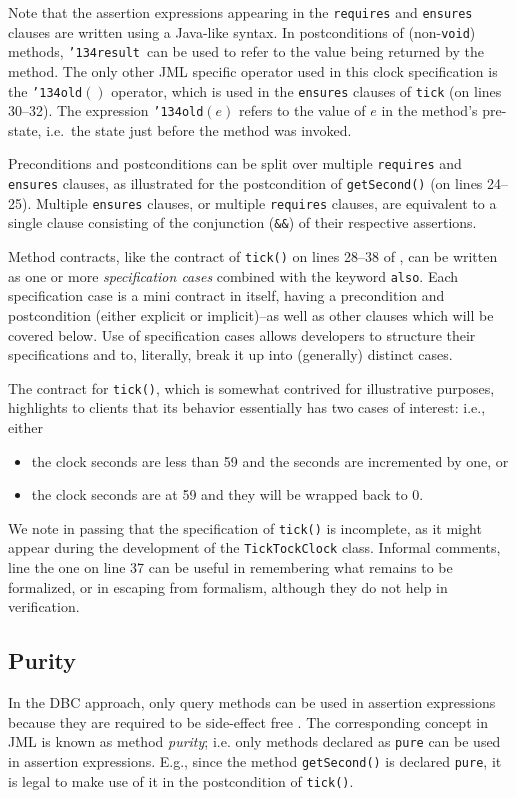 \documentclass{llncs}
\def\old{\texttt{\char'134old}}
\def\result{\texttt{\char'134result}}
\begin{document}
Note that the assertion expressions appearing in the \texttt{requires} and
\texttt{ensures} clauses are written using a Java-like syntax.
%
\GMARGIN{\old}
\GMARGIN{\result}
%
In postconditions of (non-\texttt{void}) methods, \result\ can be used to refer to the 
value being returned by the method.
The only other JML specific operator used in this clock specification is the
\old$()$ operator, which is used in the \texttt{ensures} clauses of
\texttt{tick} (on lines 30--32).  The 
expression \old$(e)$ refers to the value of $e$ in the method's pre-state,
i.e.\ the state just before the method was invoked.

Preconditions and postconditions can be split over multiple \texttt{requires}
and \texttt{ensures} clauses, as illustrated for the postcondition of 
\texttt{getSecond()} (on lines 24--25).  Multiple \texttt{ensures}
clauses, or multiple \texttt{requires} clauses, are equivalent to
a single clause consisting of the conjunction (\texttt{\&\&}) of their
respective assertions.

Method contracts, like the contract of \texttt{tick()} on lines 28--38
of , can be written as one or
more \emph{specification cases} combined with the keyword \texttt{also}.
Each specification case is a mini contract in itself, having a precondition
and postcondition (either explicit or implicit)--as well as other clauses
which will be covered below.
Use of specification cases allows developers to structure their
specifications and to, literally, break it up into (generally) distinct cases.

The contract for \texttt{tick()},
which is somewhat contrived for illustrative purposes,
highlights to clients that its behavior 
essentially has two cases of interest: i.e., either 
\begin{itemize}
  \item the clock seconds are less than 59 and the seconds are incremented by one,
    or
  \item the clock seconds are at 59 and they will be wrapped back to 0.
\end{itemize}
%
We note in passing that the specification of \texttt{tick()} is incomplete, as
it might appear during the development of the \texttt{TickTockClock} class.
Informal comments, line the one on line 37 can be useful in
remembering what remains to be formalized, or in escaping from
formalism, although they do not help in verification. 

\subsection{Purity}
\label{Sec:purity}
%
In the DBC approach, only query methods can be used in assertion expressions
because they are required to be side-effect free \cite{Meyer97}.
% 
The corresponding concept in JML is known as method \emph{purity}; i.e. only methods
declared as \texttt{pure} can be used in assertion expressions. 
E.g., since the method \texttt{getSecond()} is declared \texttt{pure}, it is
legal to make use of it in the postcondition of \texttt{tick()}.
\end{document}
